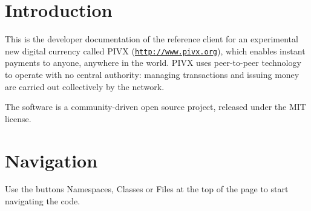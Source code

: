 \hypertarget{index_intro_sec}{}\section{Introduction}\label{index_intro_sec}
This is the developer documentation of the reference client for an experimental new digital currency called P\+I\+VX (\href{http://www.pivx.org}{\tt http\+://www.\+pivx.\+org}), which enables instant payments to anyone, anywhere in the world. P\+I\+VX uses peer-\/to-\/peer technology to operate with no central authority\+: managing transactions and issuing money are carried out collectively by the network.

The software is a community-\/driven open source project, released under the M\+IT license.\hypertarget{index_Navigation}{}\section{Navigation}\label{index_Navigation}
Use the buttons {\ttfamily Namespaces}, {\ttfamily Classes} or {\ttfamily Files} at the top of the page to start navigating the code. 